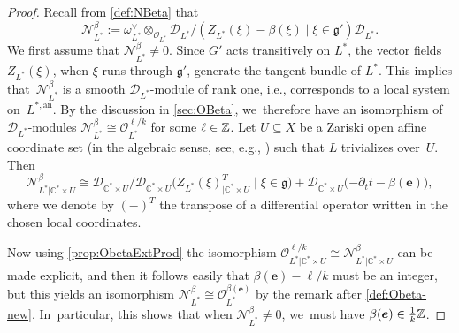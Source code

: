 \documentclass[11pt]{article}
\newcommand{\ie}{i.e.,\xspace}
\let\mathds\mathbb
\newcommand{\bme}{{\boldsymbol{e}}}
\newcommand{\dC}{{\mathds C}}\let\C\dC
\newcommand{\cD}{\mathscr{D}}
\newcommand{\cO}{\mathcal{O}}\let\O\cO
\newcommand{\frg}{\mathfrak{g}}
\begin{document}
\begin{proof}
Recall from \cref{def:NBeta} that
\[
\mathscr N_{L^*}^\beta := \omega_{L^*}^\vee \otimes_{\O_{L^*}} \mathscr{D}_{L^*}/(Z_{L^*}(\xi)-\beta(\xi) \mid \xi \in \frg')\mathscr{D}_{L^*}.
\]
We first assume that $\mathscr N_{L^*}^\beta \neq 0$. Since $G'$ acts transitively on $L^*$, the vector fields $Z_{L^*}(\xi)$, when $\xi$ runs through $\frg'$, generate the tangent bundle of $L^*$. This implies that~$\mathscr N_{L^*}^\beta$ is a smooth $\mathscr{D}_{L^*}$\nobreakdash-mod\-ule of rank one, \ie corresponds to a local system on~$L^{*,\mathrm{an}}$.
By the discussion in \cref{sec:OBeta}, we~therefore have an isomorphism of $\cD_{L^*}$\nobreakdash-mod\-ules
$\mathscr N_{L^*}^\beta\cong \cO_{L^*}^{\ell/k}$ for some $\ell\in\Z$. Let $U\subseteq X$ be a Zariski open affine coordinate set (in the algebraic sense, see, e.g., \cite[Def.\,A.5.2]{Hotta}) such that $L$ trivializes over~$U$. Then
\[
\mathscr N_{L^*|\dC^*\times U}^\beta \cong
\cD_{\dC^*\times U}/\cD_{\dC^*\times U}\bigl(Z_{L^*}(\xi)_{|\dC^*\times U}^T\mid \xi\in\frg)+
\cD_{\dC^*\times U}(-\partial_t t -\beta(\bme)\bigr),
\]
where we denote by $(-)^T$ the transpose of a differential operator written in the chosen local coordinates.

Now using \cref{prop:ObetaExtProd} the isomorphism $\cO_{L^*|\dC^*\times U}^{\ell/k}\cong \mathscr N_{L^*|\dC^*\times U}^\beta$ can be made explicit, and then it follows easily that $\beta(\bme)-\ell/k$ must be an integer, but this yields an isomorphism $ \mathscr N_{L^*}^\beta \cong \cO_{L^*}^{\beta(\bme)}$ by the remark after \cref{def:Obeta-new}. In~particular, this shows that when $\mathscr N_{L^*}^\beta\neq 0$, we~must have $\beta(\bme)\in\frac{1}{k}\Z$.


\end{proof}
\end{document}
